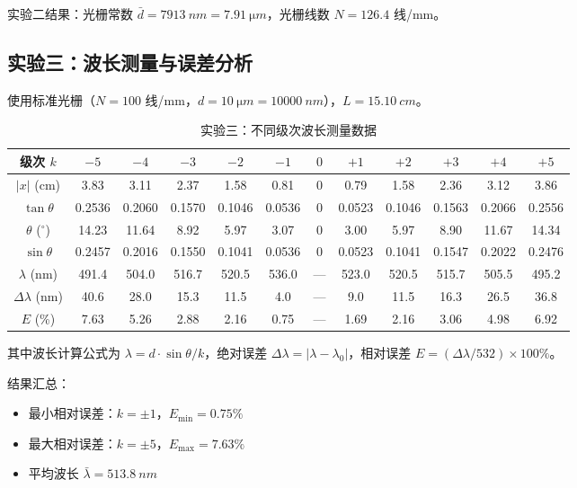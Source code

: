 \documentclass[12pt, a4paper]{article}
\begin{document}
实验二结果：光栅常数 $\bar{d} = \SI{7913}{nm} = \SI{7.91}{\micro m}$，光栅线数 $N = 126.4$ 线/mm。

\subsection{实验三：波长测量与误差分析}

使用标准光栅（$N = 100$ 线/mm，$d = \SI{10}{\micro m} = \SI{10000}{nm}$），$L = \SI{15.10}{cm}$。

\begin{table}[H]
\centering
\caption{实验三：不同级次波长测量数据}
\begin{tabular}{cccccccccccc}
\toprule
级次 $k$ & $-5$ & $-4$ & $-3$ & $-2$ & $-1$ & $0$ & $+1$ & $+2$ & $+3$ & $+4$ & $+5$ \\
\midrule
$|x|$ (cm) & 3.83 & 3.11 & 2.37 & 1.58 & 0.81 & 0 & 0.79 & 1.58 & 2.36 & 3.12 & 3.86 \\
$\tan\theta$ & 0.2536 & 0.2060 & 0.1570 & 0.1046 & 0.0536 & 0 & 0.0523 & 0.1046 & 0.1563 & 0.2066 & 0.2556 \\
$\theta$ ($^\circ$) & 14.23 & 11.64 & 8.92 & 5.97 & 3.07 & 0 & 3.00 & 5.97 & 8.90 & 11.67 & 14.34 \\
$\sin\theta$ & 0.2457 & 0.2016 & 0.1550 & 0.1041 & 0.0536 & 0 & 0.0523 & 0.1041 & 0.1547 & 0.2022 & 0.2476 \\
$\lambda$ (nm) & 491.4 & 504.0 & 516.7 & 520.5 & 536.0 & --- & 523.0 & 520.5 & 515.7 & 505.5 & 495.2 \\
$\Delta\lambda$ (nm) & 40.6 & 28.0 & 15.3 & 11.5 & 4.0 & --- & 9.0 & 11.5 & 16.3 & 26.5 & 36.8 \\
$E$ (\%) & 7.63 & 5.26 & 2.88 & 2.16 & 0.75 & --- & 1.69 & 2.16 & 3.06 & 4.98 & 6.92 \\
\bottomrule
\end{tabular}
\end{table}

其中波长计算公式为 $\lambda = d \cdot \sin\theta / k$，绝对误差 $\Delta\lambda = |\lambda - \lambda_0|$，相对误差 $E = (\Delta\lambda / 532) \times 100\%$。

结果汇总：
\begin{itemize}
  \item 最小相对误差：$k = \pm 1$，$E_{\min} = 0.75\%$
  \item 最大相对误差：$k = \pm 5$，$E_{\max} = 7.63\%$
  \item 平均波长 $\bar{\lambda} = \SI{513.8}{nm}$
\end{itemize}
\end{document}
